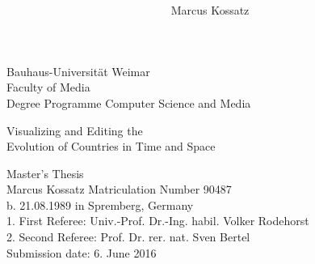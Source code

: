 \documentclass[10pt, a4paper]{report}
\title{\titleFirst \\ \titleSecond}
\author{Marcus Kossatz}
\date{\submissionDate}
\newcommand{\titleFirst}  {Visualizing and Editing the}
\newcommand{\titleSecond} {Evolution of Countries in Time and Space}
\newcommand{\submissionDate}{6. June 2016}
\begin{document}

\begin{titlepage}

Bauhaus-Universität Weimar \\
Faculty of Media \\
Degree Programme Computer Science and Media \\ [2.0cm]

\begin{center}

{\huge \titleFirst} \\[0.5cm]
{\huge \titleSecond} \\[3.5cm]
\end{center}

{\LARGE Master's Thesis} \\[1.0cm]

Marcus Kossatz \hfill Matriculation Number 90487 \\
b. 21.08.1989 in Spremberg, Germany \\

1. First Referee: Univ.-Prof. Dr.-Ing. habil. Volker Rodehorst \\
2. Second Referee: Prof. Dr. rer. nat. Sven Bertel \\

\vfill
Submission date: \submissionDate

\end{titlepage}



\tableofcontents

\begin{footnotesize}
  \listoffigures
  \listoftables
\end{footnotesize}
















{\footnotesize{
  {}
}}





\end{document}
